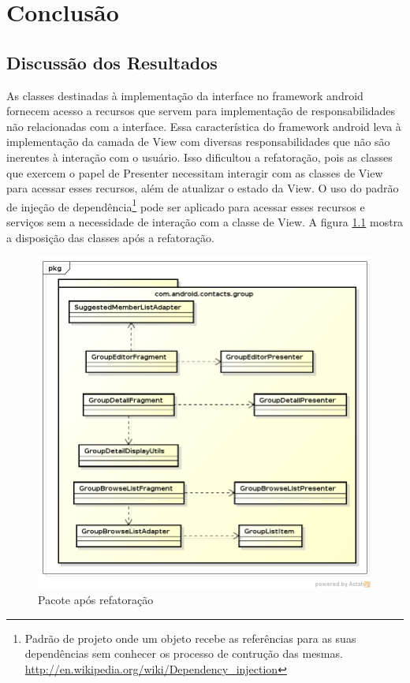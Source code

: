 \chapter{Conclusão} 

\section{Discussão dos Resultados} 

As classes destinadas à implementação da interface no framework android fornecem
acesso a recursos que servem para implementação de responsabilidades não
relacionadas com a interface. Essa característica do framework android leva à
implementação da camada de View com diversas responsabilidades que não são
inerentes à interação com o usuário. Isso dificultou a refatoração, pois as
classes que exercem o papel de Presenter necessitam interagir com as classes de
View para acessar esses recursos, além de atualizar o estado da View. O uso do
padrão de injeção de
dependência\footnote{Padrão
de projeto onde um objeto recebe as referências para as suas dependências sem
conhecer os processo de contrução das mesmas.
\url{http://en.wikipedia.org/wiki/Dependency_injection}}
pode ser aplicado para acessar esses recursos e serviços sem a necessidade de
interação com a classe de View. A figura \ref{fig:classes_iteracao3} mostra a
disposição das classes após a refatoração.


\begin{figure}[htb]
	\label{fig:classes_iteracao3}
	\caption{Pacote após refatoração}
	\begin{center}
		\includegraphics[scale=0.5]{img/classes_iteracao3}
	\end{center}
\end{figure}


